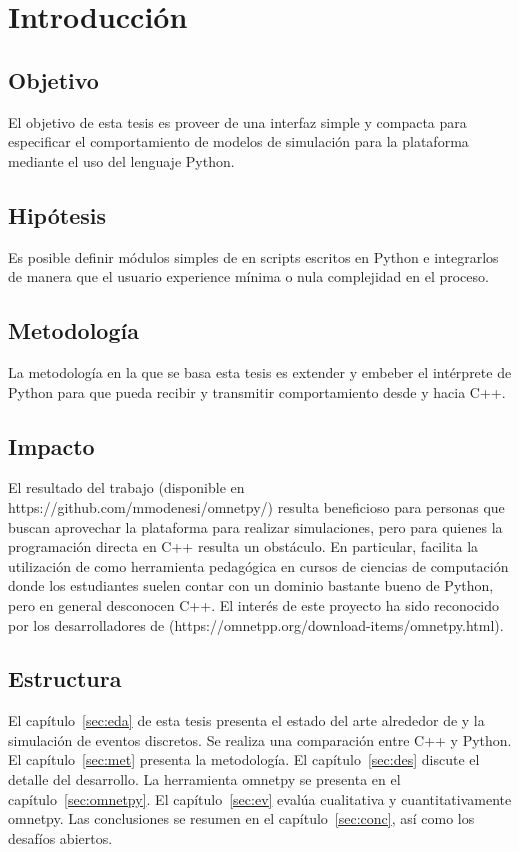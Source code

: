 \chapter{Introducción}
\section{Objetivo}

El objetivo de esta tesis \cite{einstein} es proveer de una interfaz simple y compacta para
especificar el comportamiento de modelos de simulación para la plataforma
\omnetpp{} mediante el uso del lenguaje Python.

\section{Hipótesis}

Es posible definir módulos simples de \omnetpp{} en scripts escritos en Python e
integrarlos de manera que el usuario experience mínima o nula complejidad en el
proceso.

\section{Metodología}

La metodología en la que se basa esta tesis es extender y embeber el intérprete
de Python para que pueda recibir y transmitir comportamiento desde y hacia C++.

\section{Impacto}

El resultado del trabajo (disponible en https://github.com/mmodenesi/omnetpy/)
resulta beneficioso para personas que buscan aprovechar la plataforma \omnetpp{}
para realizar simulaciones, pero para quienes la programación directa en C++
resulta un obstáculo. En particular, facilita la utilización de \omnetpp{} como
herramienta pedagógica en cursos de ciencias de computación donde los
estudiantes suelen contar con un dominio bastante bueno de Python, pero en
general desconocen C++.  El interés de este proyecto ha sido reconocido por los
desarrolladores de \omnetpp{} (https://omnetpp.org/download-items/omnetpy.html).

\section{Estructura}

El capítulo~\ref{sec:eda} de esta tesis presenta el estado del arte alrededor
de \omnetpp{} y la simulación de eventos discretos. Se realiza una comparación
entre C++ y Python. El capítulo~\ref{sec:met} presenta la metodología. El
capítulo~\ref{sec:des} discute el detalle del desarrollo. La herramienta
omnetpy se presenta en el capítulo~\ref{sec:omnetpy}. El capítulo~\ref{sec:ev}
evalúa cualitativa y cuantitativamente omnetpy. Las conclusiones se resumen en
el capítulo~\ref{sec:conc}, así como los desafíos abiertos.

